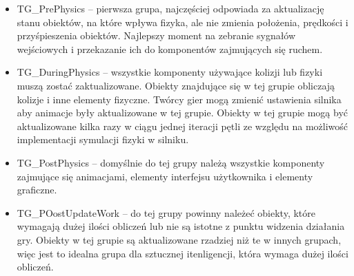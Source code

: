 \documentclass[12pt,twoside]{article}
\begin{document}
\begin{itemize}
    


\item TG\_PrePhysics – pierwsza grupa, najczęściej odpowiada za aktualizację
stanu obiektów, na które wpływa fizyka, ale nie zmienia położenia, prędkości i
przyśpieszenia obiektów. Najlepszy moment na zebranie sygnałów wejściowych i
przekazanie ich do komponentów zajmujących się ruchem.

\item TG\_DuringPhysics – wszystkie komponenty używające kolizji lub fizyki muszą
zostać zaktualizowane. Obiekty znajdujące się w tej grupie obliczają kolizje i
inne elementy fizyczne. Twórcy gier mogą zmienić ustawienia silnika aby animacje
były aktualizowane w tej grupie. Obiekty w tej grupie mogą być aktualizowane
kilka razy w ciągu jednej iteracji pętli ze względu na możliwość implementacji
symulacji fizyki w silniku. 

\item TG\_PostPhysics – domyślnie do tej grupy należą wszystkie komponenty
zajmujące się animacjami, elementy interfejsu użytkownika i elementy graficzne. 

\item TG\_POostUpdateWork – do tej grupy powinny należeć obiekty, które wymagają
dużej ilości obliczeń lub nie są istotne z punktu widzenia działania gry.
Obiekty w tej grupie są aktualizowane rzadziej niż te w innych grupach, więc
jest to idealna grupa dla sztucznej itenligencji, która wymaga dużej ilości
obliczeń. 
\end{itemize}
\end{document}
